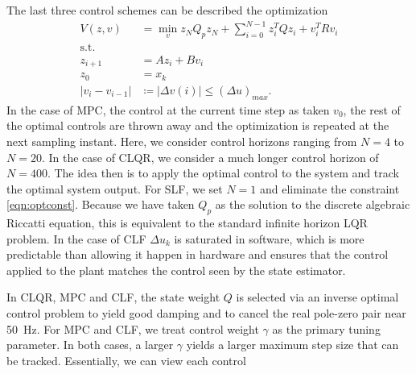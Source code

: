 \documentclass[journal,12pt,twocolumn,twoside]{IEEEtran/IEEEtran}
\begin{document}
The last three control schemes can be described the optimization
\begin{align}
V(z,v) &= \min_{v} z_{N}Q_{p}z_{N} + \sum_{i=0}^{N-1}z_{i}^{T}Qz_{i} + v^{T}_{i}Rv_{i}\\
 \text{s.t.}&\\
z_{i+1} &= Az_{i} + Bv_{i}\\
z_{0} &= x_{k}\\
|v_i - v_{i-1}| &\coloneqq |\Delta v(i)| \leq (\Delta u)_{max}.\label{eqn:optconst}
\end{align}
In the case of MPC, the control at the current time step as taken $v_0$, the rest of the optimal controls are thrown away and the optimization is repeated at the next sampling instant. Here, we consider control horizons ranging from $N=4$ to $N=20$. In the case of CLQR, we consider a much longer control horizon of $N=400$. The idea then is to apply the optimal control to the system and track the optimal system output. For SLF, we set $N=1$ and eliminate the constraint \eqref{eqn:optconst}. Because we have taken $Q_p$ as the solution to the discrete algebraic Riccatti equation, this is equivalent to the standard infinite horizon LQR problem. In the case of CLF $\Delta u_k$ is saturated in software, which is more predictable than allowing it happen in hardware and ensures that the control applied to the plant matches the control seen by the state estimator.

In CLQR, MPC and CLF,  the state weight $Q$ is selected via an inverse optimal control problem to yield good damping and to cancel the real pole-zero pair near 50~Hz. For MPC and CLF, we treat control weight $\gamma$ as the primary tuning parameter. In both cases, a larger $\gamma$ yields a larger maximum step size that can be tracked. Essentially, we can view each control 
\end{document}
